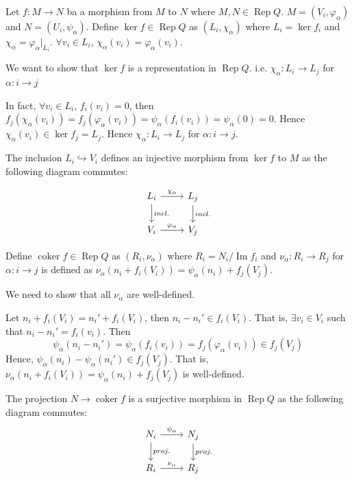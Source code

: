 \documentclass[11pt, a4paper]{report}
\begin{document}
Let $f:M\to N$ ba a morphism from $M$ to $N$ where $M,N \in \operatorname{Rep}Q$. $M=(V_i, \varphi_\alpha)$ and $N=(U_i, \psi_\alpha)$. Define $\operatorname{ker}f \in \operatorname{Rep}Q$ as $(L_i, \chi_\alpha)$ where $L_i=\operatorname{ker}f_i$ and $\chi_\alpha=\varphi_\alpha|_{L_i}$. $\forall v_i \in L_i$, $\chi_\alpha(v_i)=\varphi_\alpha(v_i)$.

We want to show that $\operatorname{ker}f$ is a representation in $\operatorname{Rep}Q$. i.e. $\chi_{\alpha}: L_i \to L_j$ for $\alpha: i \to j$ 

In fact, $ \forall v_i \in L_i $, $ f_i(v_i)=0 $, then $ f_j (\chi_\alpha(v_i)) = f_j (\varphi_\alpha(v_i)) = \psi_\alpha(f_i(v_i)) = \psi_\alpha(0) = 0 $. Hence $ \chi_\alpha(v_i) \in \operatorname{ker}f_j = L_j $. Hence $ \chi_\alpha: L_i \to L_j $ for $\alpha: i \to j$.

The inclusion $ L_i \hookrightarrow V_i $ defines an injective morphism from $\operatorname{ker}f$ to $M$ as the following diagram commutes:

\[
\begin{tikzcd}
L_i \arrow[r, "\chi_\alpha"] \arrow[d, "incl."] & L_j \arrow[d, "incl."] \\
V_i \arrow[r, "\varphi_\alpha"] & V_j
\end{tikzcd}
\]

Define $ \operatorname{coker}f \in \operatorname{Rep}Q $ as $ (R_i, \nu_\alpha) $ where $ R_i = N_i / \operatorname{Im}f_i $ and $ \nu_\alpha: R_i \to R_j $ for $\alpha: i \to j$ is defined as $ \nu_\alpha(n_i + f_i(V_i)) = \psi_\alpha(n_i) + f_j(V_j) $.

We need to show that all $\nu_\alpha$ are well-defined.

Let $ n_i + f_i(V_i) = n_i' + f_i(V_i) $, then $ n_i - n_i' \in f_i(V_i) $. That is, $ \exists v_i \in V_i $ such that $ n_i - n_i' = f_i(v_i) $. Then
\[
\psi_\alpha(n_i - n_i') = \psi_\alpha(f_i(v_i)) = f_j(\varphi_\alpha(v_i)) \in f_j(V_j)
\]
Hence, $ \psi_\alpha(n_i) - \psi_\alpha(n_i') \in f_j(V_j) $. That is, $ \nu_\alpha(n_i + f_i(V_i)) = \psi_\alpha(n_i) + f_j(V_j) $ is well-defined.

The projection $ N \to \operatorname{coker}f $ is a surjective morphism in $\operatorname{Rep}Q$ as the following diagram commutes:
\[
\begin{tikzcd}
N_i \arrow[r, "\psi_\alpha"] \arrow[d, "proj."] & N_j \arrow[d, "proj."] \\
R_i \arrow[r, "\nu_\alpha"] & R_j 
\end{tikzcd}
\]
\end{document}
